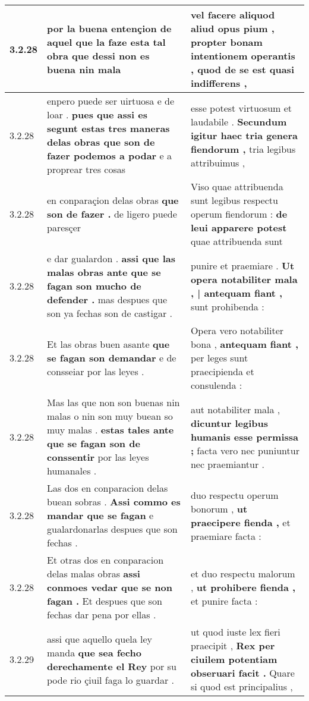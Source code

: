 \begin{tabular}{|p{1cm}|p{6.5cm}|p{6.5cm}|}
3.2.28 & por la buena entençion \textbf{ de aquel que la faze esta tal obra } que dessi non es buena nin mala & vel facere aliquod aliud opus pium , \textbf{ propter bonam intentionem operantis , } quod de se est quasi indifferens , \\\hline
3.2.28 & enpero puede ser uirtuosa e de loar . \textbf{ pues que assi es segunt estas tres maneras delas obras que son de fazer podemos a podar } e a proprear tres cosas & esse potest virtuosum et laudabile . \textbf{ Secundum igitur haec tria genera fiendorum , } tria legibus attribuimus , \\\hline
3.2.28 & en conparaçion delas obras \textbf{ que son de fazer . } de ligero puede paresçer & Viso quae attribuenda sunt legibus respectu operum fiendorum : \textbf{ de leui apparere potest } quae attribuenda sunt \\\hline
3.2.28 & e dar gualardon . \textbf{ assi que las malas obras ante que se fagan son mucho de defender . } mas despues que son ya fechas son de castigar . & punire et praemiare . \textbf{ Ut opera notabiliter mala , | antequam fiant , } sunt prohibenda : \\\hline
3.2.28 & Et las obras buen asante \textbf{ que se fagan son demandar } e de consseiar por las leyes . & Opera vero notabiliter bona , \textbf{ antequam fiant , } per leges sunt praecipienda et consulenda : \\\hline
3.2.28 & Mas las que non son buenas nin malas o nin son muy buean so muy malas . \textbf{ estas tales ante que se fagan son de conssentir } por las leyes humanales . & aut notabiliter mala , \textbf{ dicuntur legibus humanis esse permissa ; } facta vero nec puniuntur nec praemiantur . \\\hline
3.2.28 & Las dos en conparacion delas buean sobras . \textbf{ Assi commo es mandar que se fagan } e gualardonarlas despues que son fechas . & duo respectu operum bonorum , \textbf{ ut praecipere fienda , } et praemiare facta : \\\hline
3.2.28 & Et otras dos en conparacion delas malas obras \textbf{ assi conmoes vedar que se non fagan . } Et despues que son fechas dar pena por ellas . & et duo respectu malorum , \textbf{ ut prohibere fienda , } et punire facta : \\\hline
3.2.29 & assi que aquello quela ley manda \textbf{ que sea fecho derechamente el Rey } por su pode rio çiuil faga lo guardar . & ut quod iuste lex fieri praecipit , \textbf{ Rex per ciuilem potentiam obseruari facit . } Quare si quod est principalius , \\\hline

\end{tabular}
